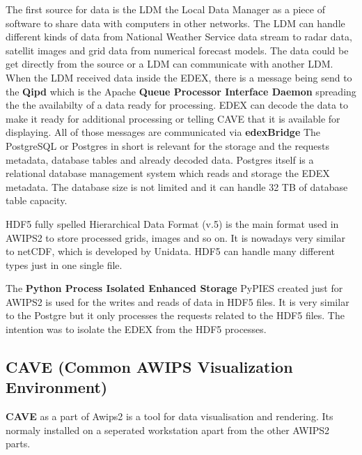 \documentclass[]{article}
\begin{document}
The first source for data is the LDM the Local Data Manager as a piece
of software to share data with computers in other networks. The LDM can
handle different kinds of data from National Weather Service data stream
to radar data, satellit images and grid data from numerical forecast
models. The data could be get directly from the source or a LDM can
communicate with another LDM. When the LDM received data inside the
EDEX, there is a message being send to the \textbf{Qipd} which is the
Apache \textbf{Queue Processor Interface Daemon} spreading the the
availabilty of a data ready for processing. EDEX can decode the data to
make it ready for additional processing or telling CAVE that it is
available for displaying. All of those messages are communicated via
\textbf{edexBridge} The PostgreSQL or Postgres in short is relevant for
the storage and the requests metadata, database tables and already
decoded data. Postgres itself is a relational database management system
which reads and storage the EDEX metadata. The database size is not
limited and it can handle 32 TB of database table capacity.

HDF5 fully spelled Hierarchical Data Format (v.5) is the main format
used in AWIPS2 to store processed grids, images and so on. It is
nowadays very similar to netCDF, which is developed by Unidata. HDF5 can
handle many different types just in one single file.

The \textbf{Python Process Isolated Enhanced Storage} PyPIES created
just for AWIPS2 is used for the writes and reads of data in HDF5 files.
It is very similar to the Postgre but it only processes the requests
related to the HDF5 files. The intention was to isolate the EDEX from
the HDF5 processes.

\subsection{CAVE (Common AWIPS Visualization
Environment)}\label{cave-common-awips-visualization-environment}

\textbf{CAVE} as a part of Awips2 is a tool for data visualisation and
rendering. Its normaly installed on a seperated workstation apart from
the other AWIPS2 parts.
\end{document}
